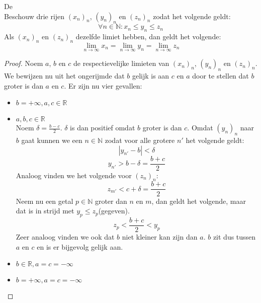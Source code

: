 \documentclass[main.tex]{subfiles}
\begin{document}
\begin{bst}
  \label{st:insluitstelling}
  De \\
  Beschouw drie rijen $(x_{n})_{n}$, $(y_{n})_{n}$ en $(z_{n})_{n}$ zodat het volgende geldt:
  \[ \forall n\in \mathbb{N}: x_{n}\le y_{n}\le z_{n} \]
  Als $(x_{n})_{n}$ en $(z_{n})_{n}$ dezelfde limiet hebben, dan geldt het volgende:
  \[ \lim_{n\rightarrow \infty}x_{n} = \lim_{n\rightarrow \infty}y_{n} = \lim_{n\rightarrow \infty}z_{n} \]

  \begin{proof}
    Noem $a$, $b$ en $c$ de respectievelijke limieten van $(x_{n})_{n}$, $(y_{n})_{n}$ en $(z_{n})_{n}$.
    We bewijzen nu uit het ongerijmde dat $b$ gelijk is aan $c$ en $a$ door te stellen dat $b$ groter is dan $a$ en $c$.
    Er zijn nu vier gevallen:
    \begin{itemize}
    \item $b = +\infty, a,c \in \mathbb{R}$\\
    \item $a,b,c\in \mathbb{R}$\\
      Noem $\delta = \frac{b-c}{2}$.
      $\delta$ is dan positief omdat $b$ groter is dan $c$.
      Omdat $(y_{n})_{n}$ naar $b$ gaat kunnen we een $n\in \mathbb{N}$ zodat voor alle grotere $n'$ het volgende geldt:
      \[ |y_{n'}-b|<\delta \]
      \[ y_{n'} > b - \delta = \frac{b+c}{2} \]
      Analoog vinden we het volgende voor $(z_{n})_{n}$:
      \[ z_{m'} < c+\delta = \frac{b+c}{2} \]
      Neem nu een getal $p\in \mathbb{N}$ groter dan $n$ en $m$, dan geldt het volgende, maar dat is in strijd met $y_{p} \le z_{p}$(gegeven).
      \[ z_{p} < \frac{b+c}{2} < y_{p} \]
      Zeer analoog vinden we ook dat $b$ niet kleiner kan zijn dan $a$.
      $b$ zit dus tussen $a$ en $c$ en is er bijgevolg gelijk aan.
    \item $b\in \mathbb{R}, a=c = -\infty$\\
    \item $b= +\infty, a=c=-\infty$\\
    \end{itemize}
  \end{proof}
\end{bst}
\end{document}
